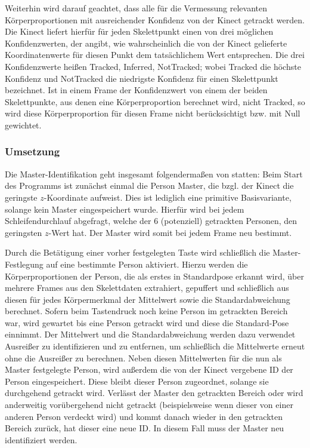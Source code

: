 Weiterhin wird darauf geachtet, dass alle für die Vermessung relevanten Körperproportionen mit ausreichender Konfidenz von der Kinect getrackt werden. Die Kinect liefert hierfür für jeden Skelettpunkt einen von drei möglichen Konfidenzwerten, der angibt, wie wahrscheinlich die von der Kinect gelieferte Koordinatenwerte für diesen Punkt dem tatsächlichem Wert entsprechen. Die drei Konfidenzwerte heißen Tracked, Inferred, NotTracked; wobei Tracked die höchste Konfidenz und NotTracked die niedrigste Konfidenz für einen Skelettpunkt bezeichnet. Ist in einem Frame der Konfidenzwert von einem der beiden Skelettpunkte, aus denen eine Körperproportion berechnet wird, nicht Tracked, so wird diese Körperproportion für diesen Frame nicht berücksichtigt bzw. mit Null gewichtet. \par
\subsubsection{Umsetzung}
Die Master-Identifikation geht insgesamt folgendermaßen von statten: Beim Start des Programms ist zunächst einmal die Person Master, die bzgl. der Kinect die geringste $z$-Koordinate aufweist. Dies ist lediglich eine primitive Basisvariante, solange kein Master eingespeichert wurde. Hierfür wird bei jedem Schleifendurchlauf abgefragt, welche der 6 (potenziell) getrackten Personen, den geringsten $z$-Wert hat. Der Master wird somit bei jedem Frame neu bestimmt.
\par
 Durch die Betätigung einer vorher festgelegten Taste wird schließlich die Master-Festlegung auf eine bestimmte Person aktiviert. Hierzu werden die Körperproportionen der Person, die als erstes in Standardpose erkannt wird, über mehrere Frames aus den Skelettdaten extrahiert, gepuffert und schließlich aus diesen für jedes Körpermerkmal der Mittelwert sowie die Standardabweichung berechnet. Sofern beim Tastendruck noch keine Person im getrackten Bereich war, wird gewartet bis eine Person getrackt wird und diese die Standard-Pose einnimmt. Der Mittelwert und die Standardabweichung werden dazu verwendet Ausreißer zu identifizieren und zu entfernen, um schließlich die Mittelwerte erneut ohne die Ausreißer zu berechnen. Neben diesen Mittelwerten für die nun als Master festgelegte Person, wird außerdem die von der Kinect vergebene ID der Person eingespeichert. Diese bleibt dieser Person zugeordnet, solange sie durchgehend getrackt wird. Verlässt der Master den getrackten Bereich oder wird anderweitig vorübergehend nicht getrackt (beispielsweise wenn dieser von einer anderen Person verdeckt wird) und kommt danach wieder in den getrackten Bereich zurück, hat dieser eine neue ID. In diesem Fall muss der Master neu identifiziert werden. 
 
